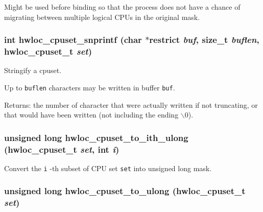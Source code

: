 Might be used before binding so that the process does not have a chance of migrating between multiple logical CPUs in the original mask. \hypertarget{group__hwlocality__cpuset_gaa64dfeea7ff3c8427c88ac285be714e}{
\subsubsection[{hwloc\_\-cpuset\_\-snprintf}]{\setlength{\rightskip}{0pt plus 5cm}int hwloc\_\-cpuset\_\-snprintf (char $\ast$restrict {\em buf}, \/  size\_\-t {\em buflen}, \/  {\bf hwloc\_\-cpuset\_\-t} {\em set})}}
\label{group__hwlocality__cpuset_gaa64dfeea7ff3c8427c88ac285be714e}


Stringify a cpuset. 

Up to {\tt buflen} characters may be written in buffer {\tt buf}.

\begin{Desc}
\item[Returns:]the number of character that were actually written if not truncating, or that would have been written (not including the ending $\backslash$0). \end{Desc}
\hypertarget{group__hwlocality__cpuset_g509b2e92503092d3809c5fd71ecfceb9}{
\subsubsection[{hwloc\_\-cpuset\_\-to\_\-ith\_\-ulong}]{\setlength{\rightskip}{0pt plus 5cm}unsigned long hwloc\_\-cpuset\_\-to\_\-ith\_\-ulong ({\bf hwloc\_\-cpuset\_\-t} {\em set}, \/  int {\em i})}}
\label{group__hwlocality__cpuset_g509b2e92503092d3809c5fd71ecfceb9}


Convert the {\tt i} -th subset of CPU set {\tt set} into unsigned long mask. 

\hypertarget{group__hwlocality__cpuset_g107de17ed191778705d959fa471a2504}{
\subsubsection[{hwloc\_\-cpuset\_\-to\_\-ulong}]{\setlength{\rightskip}{0pt plus 5cm}unsigned long hwloc\_\-cpuset\_\-to\_\-ulong ({\bf hwloc\_\-cpuset\_\-t} {\em set})}}
\label{group__hwlocality__cpuset_g107de17ed191778705d959fa471a2504}


